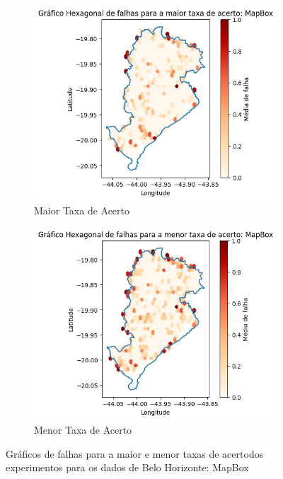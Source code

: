 \begin{figure}[ht]
  \centering
  \begin{subfigure}[b]{0.45\textwidth}
    \includegraphics[width=\textwidth]{Figuras/expFalhasMapboxmaior.png}
    \caption{Maior Taxa de Acerto}
    \label{fig:falhasmapboxBHexpMaior}
  \end{subfigure}
  \begin{subfigure}[b]{0.45\textwidth}
    \includegraphics[width=\textwidth]{Figuras/expFalhasMapboxmenor.png}
    \caption{Menor Taxa de Acerto}
    \label{fig:falhasmapboxBHexpMenor}
  \end{subfigure}
  
  \caption{Gráficos de falhas para a maior e menor taxas de acertodos experimentos para os dados de Belo Horizonte: MapBox}
  \label{fig:falhas-exp-mapbox-bh}
\end{figure}

